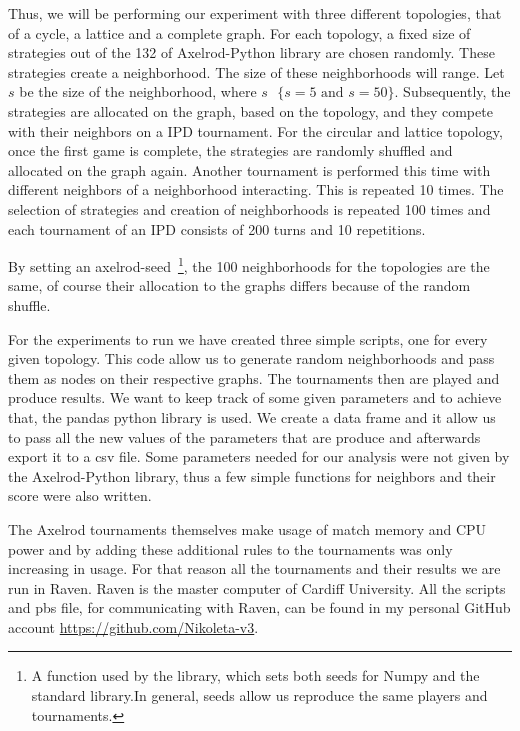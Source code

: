 Thus, we will be performing our experiment with three different topologies, that
of a cycle, a lattice and a complete graph.
For each topology, a fixed size of strategies out of the 132 of Axelrod-Python
library are chosen randomly. These strategies create a neighborhood.
The size of these neighborhoods will range. Let \( s\) be the size of
the neighborhood, where \(s \textrm{ }\{ s=5 \textrm{ and } s=50 \}\).
Subsequently, the strategies are allocated on the graph, based
on the topology, and they compete with their neighbors on a IPD tournament.
For the circular and lattice topology, once the first game is complete,
the strategies are randomly shuffled and allocated on the graph again.
Another tournament is performed this time with different neighbors of a
neighborhood interacting. This is repeated 10 times.
The selection of strategies and creation of neighborhoods is repeated 100 times
and each tournament of an IPD consists of 200 turns and 10 repetitions.

By setting an axelrod-seed~\footnote{A function used by the library, which sets
both seeds for Numpy and the standard library.In general, seeds allow us
reproduce the same players and tournaments.}, the 100 neighborhoods for the
topologies are the same, of course their allocation to the graphs differs because
of the random shuffle.

For the experiments to run we have created three simple scripts, one for every
given topology. This code allow us to generate random
neighborhoods and pass them as nodes on their respective graphs. The tournaments
then are played and produce results. We want to keep track of some given
parameters and to achieve that, the pandas python library is used. We create
a data frame and it allow us to pass all the new values of the parameters that
are produce and afterwards export it to a csv file. Some parameters needed for our
analysis were not given by the Axelrod-Python library, thus a few simple
functions for neighbors and their score were also written.

The Axelrod tournaments themselves make usage of match memory and CPU power and
by adding
these additional rules to the tournaments was only increasing in usage. For that
reason all the tournaments and their results we are run in Raven. Raven is the
master computer of Cardiff University. All the scripts and pbs file, for
communicating with Raven, can be found in my personal GitHub account
\url{https://github.com/Nikoleta-v3}.


